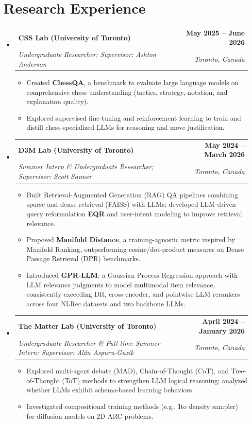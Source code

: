 \documentclass[letterpaper,11pt]{article}
\makeatletter
\newcommand{\resumeItem}[1]{
  \item\small{
    {#1 \vspace{-2pt}}
  }
}
\newcommand{\resumeSubheading}[4]{
  \vspace{-2pt}\item
    \begin{tabular*}{1.0\textwidth}[t]{l@{\extracolsep{\fill}}r}
      \textbf{#1} & \textbf{\small #2} \\
      \textit{\small#3} & \textit{\small #4} \\
    \end{tabular*}\vspace{-7pt}
}
\newcommand{\resumeSubHeadingListStart}{\begin{itemize}[leftmargin=0.0in, label={}]}
\newcommand{\resumeSubHeadingListEnd}{\end{itemize}}
\newcommand{\resumeItemListStart}{\begin{itemize}}
\newcommand{\resumeItemListEnd}{\end{itemize}\vspace{-5pt}}
\makeatother
\begin{document}
\section{Research Experience}
  \resumeSubHeadingListStart
    \resumeSubheading
      {CSS Lab (University of Toronto)}{May 2025 -- June 2026}
      {Undergraduate Researcher; Supervisor: Ashton Anderson}{Toronto, Canada}
      \resumeItemListStart
        \resumeItem{Created \textbf{ChessQA}, a benchmark to evaluate large language models on comprehensive chess understanding (tactics, strategy, notation, and explanation quality).}
        \resumeItem{Explored supervised fine-tuning and reinforcement learning to train and distill chess-specialized LLMs for reasoning and move justification.}
      \resumeItemListEnd

    \resumeSubheading
      {D3M Lab (University of Toronto)}{May 2024 -- March 2026}
      {Summer Intern \& Undergraduate Researcher; Supervisor: Scott Sanner}{Toronto, Canada}
      \resumeItemListStart
        \resumeItem{Built Retrieval-Augmented Generation (RAG) QA pipelines combining sparse and dense retrieval (FAISS) with LLMs; developed LLM-driven query reformulation \textbf{EQR} and user-intent modeling to improve retrieval relevance.}
        \resumeItem{Proposed \textbf{Manifold Distance}, a training-agnostic metric inspired by Manifold Ranking, outperforming cosine/dot-product measures on Dense Passage Retrieval (DPR) benchmarks.}
        \resumeItem{Introduced \textbf{GPR-LLM}: a Gaussian Process Regression approach with LLM relevance judgments to model multimodal item relevance, consistently exceeding DR, cross-encoder, and pointwise LLM rerankers across four NLRec datasets and two backbone LLMs.}
      \resumeItemListEnd
      
    \resumeSubheading
      {The Matter Lab (University of Toronto)}{April 2024 -- January 2026}
      {Undergraduate Researcher \& Full-time Summer Intern; Supervisor: Alán Aspuru-Guzik}{Toronto, Canada}
      \resumeItemListStart
        \resumeItem{Explored multi-agent debate (MAD), Chain-of-Thought (CoT), and Tree-of-Thought (ToT) methods to strengthen LLM logical reasoning; analyzed whether LLMs exhibit schema-based learning behaviors.}
        \resumeItem{Investigated compositional training methods (e.g., Ito density sampler) for diffusion models on 2D-ARC problems.}
      \resumeItemListEnd
  \resumeSubHeadingListEnd
\vspace{-16pt}


\end{document}
